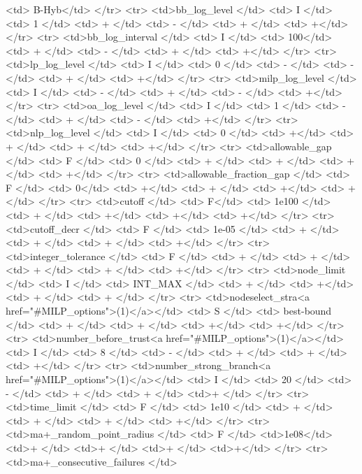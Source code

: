 {\begin{rawhtml}
    <td> B-Hyb</td>
  </tr>
  <tr>
    <td>bb_log_level </td>
    <td> I </td>
    <td> 1 </td>
    <td> + </td>
    <td> - </td>
    <td> + </td>
    <td> +</td>
  </tr>
  <tr>
    <td>bb_log_interval </td>
    <td> I </td>
    <td> 100</td>
    <td> + </td>
    <td> - </td>
    <td> + </td>
    <td> +</td>
  </tr>
  <tr>
    <td>lp_log_level </td>
    <td> I </td>
    <td> 0 </td>
    <td> - </td>
    <td> - </td>
    <td> + </td>
    <td> +</td>
  </tr>
  <tr>
    <td>milp_log_level </td>
    <td> I </td>
    <td> - </td>
    <td> + </td>
    <td> - </td>
    <td> +</td>
  </tr>
  <tr>
    <td>oa_log_level </td>
    <td> I </td>
    <td> 1 </td>
    <td> - </td>
    <td> + </td>
    <td> - </td>
    <td> +</td>
  </tr>
  <tr>
    <td>nlp_log_level </td>
    <td> I </td>
    <td> 0 </td>
    <td> +</td>
    <td> + </td>
    <td> + </td>
    <td> +</td>
  </tr>
  <tr>
    <td>allowable_gap </td>
    <td> F </td>
    <td> 0 </td>
    <td> + </td>
    <td> + </td>
    <td> + </td>
    <td> +</td>
  </tr>
  <tr>
    <td>allowable_fraction_gap </td>
    <td> F </td>
    <td> 0</td>
    <td> +</td>
    <td> + </td>
    <td> +</td>
    <td> +</td>
  </tr>
  <tr>
    <td>cutoff </td>
    <td> F</td>
    <td> 1e100 </td>
    <td> + </td>
    <td> +</td>
    <td> +</td>
    <td> +</td>
  </tr>
  <tr>
    <td>cutoff_decr </td>
    <td> F </td>
    <td> 1e-05 </td>
    <td> + </td>
    <td> + </td>
    <td> + </td>
    <td> +</td>
  </tr>
  <tr>
    <td>integer_tolerance </td>
    <td> F </td>
    <td> + </td>
    <td> + </td>
    <td> + </td>
    <td> + </td>
    <td> +</td>
  </tr>
  <tr>
    <td>node_limit </td>
    <td> I </td>
    <td> INT_MAX </td>
    <td> + </td>
    <td> +</td>
    <td> + </td>
    <td> + </td>
  </tr>
  <tr>
    <td>nodeselect_stra<a href="#MILP_options">(1)</a></td>
    <td> S </td>
    <td> best-bound </td>
    <td> + </td>
    <td> + </td>
    <td> +</td>
    <td> +</td>
  </tr>
  <tr>
    <td>number_before_trust<a href="#MILP_options">(1)</a></td>
    <td> I </td>
    <td> 8 </td>
    <td> - </td>
    <td> + </td>
    <td> + </td>
    <td> +</td>
  </tr>
  <tr>
    <td>number_strong_branch<a href="#MILP_options">(1)</a></td>
    <td> I </td>
    <td> 20 </td>
    <td> - </td>
    <td> + </td>
    <td> + </td>
    <td>+ </td>
  </tr>
  <tr>
    <td>time_limit </td>
    <td> F </td>
    <td> 1e10 </td>
    <td> + </td>
    <td> + </td>
    <td> + </td>
    <td> +</td>
  </tr>
  <tr>
    <td>ma+_random_point_radius </td>
    <td> F </td>
    <td>1e08</td>
    <td>+ </td>
    <td>+ </td>
    <td>+ </td>
    <td>+</td>
  </tr>
  <tr>
    <td>ma+_consecutive_failures </td>

\end{rawhtml}}
